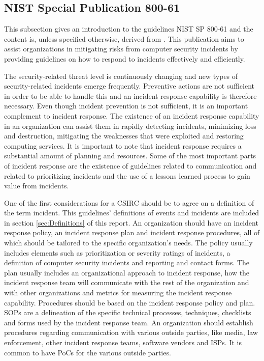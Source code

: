 \subsection{\acs{NIST} Special Publication 800-61}
This subsection gives an introduction to the guidelines \acs{NIST} SP 800-61 and the content is, unless specified otherwise, derived from \cite{nist800-61}. This publication aims to  assist organizations in mitigating risks from computer security incidents by providing guidelines on how to respond to incidents effectively and efficiently. 

The security-related threat level is continuously changing and new types of security-related incidents emerge frequently. Preventive actions are not sufficient in order to be able to handle this and an incident response capability is therefore necessary. Even though incident prevention is not sufficient, it is an important complement to incident response. The existence of an incident response capability in an organization can assist them in rapidly detecting incidents, minimizing loss and destruction, mitigating the weaknesses that were exploited and restoring computing services. It is important to note that incident response requires a substantial amount of planning and resources. Some of the most important parts of incident response are the existence of guidelines related to communication and related to prioritizing incidents and the use of a lessons learned process to gain value from incidents.

One of the first considerations for a \ac{CSIRC} should be to agree on a definition of the term incident. This guidelines' definitions of events and incidents are included in section \ref{sec:Definitions} of this report. An organization should have an incident response policy, an incident response plan and incident response procedures, all of which should be tailored to the specific organization's needs. The policy usually includes elements such as prioritization or severity ratings of incidents, a definition of computer security incidents and reporting and contact forms. The plan usually includes an organizational approach to incident response, how the incident response team will communicate with the rest of the organization and with other organizations and metrics for measuring the incident response capability. Procedures should be based on the incident response policy and plan. \acp{SOP} are a delineation of the specific technical processes, techniques, checklists and forms used by the incident response team. An organization should establish procedures regarding communication with various outside parties, like media, law enforcement, other incident response teams, software vendors and \acp{ISP}. It is common to have \acp{PoC} for the various outside parties. 

